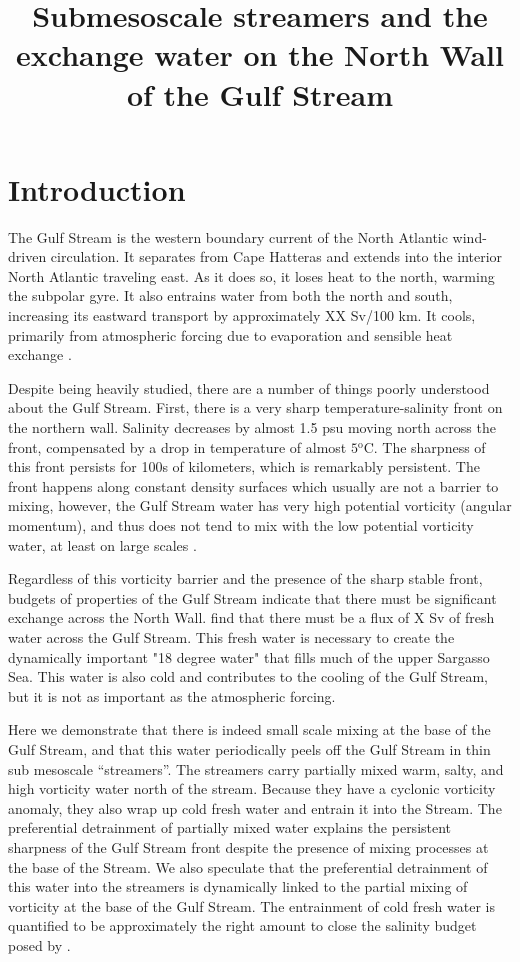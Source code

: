\documentclass{ametsoc}
\title{Submesoscale streamers and the exchange water on the North Wall of the Gulf Stream}
\affiliation{University of Victoria, Victoria, Canada}
\begin{document}
\maketitle


%
\section{Introduction}
The Gulf Stream is the western boundary current of the North Atlantic wind-driven circulation.  It separates from Cape Hatteras and extends into the interior North Atlantic traveling east.  As it does so, it loses heat to the north, warming the subpolar gyre.  It also entrains water from both the north and south, increasing its eastward transport by approximately XX Sv/100 km.  It cools, primarily from atmospheric forcing due to evaporation and sensible heat exchange \cite{joyceetal13}.  

Despite being heavily studied, there are a number of things poorly understood about the Gulf Stream.  First, there is a very sharp temperature-salinity front on the northern wall.  Salinity decreases by almost 1.5 psu moving north across the front, compensated by a drop in temperature of almost $5\mathrm{^oC}$.   The sharpness of this front persists for 100s of kilometers, which is remarkably persistent.  The front happens along constant density surfaces which usually are not a barrier to mixing, however, the Gulf Stream water has very high potential vorticity (angular momentum), and thus does not tend to mix with the low potential vorticity water, at least on large scales \citep{marshalletal06}.  

Regardless of this vorticity barrier and the presence of the sharp stable front, budgets of properties of the Gulf Stream indicate that there must be significant exchange across the North Wall. \citet{joyceetal13} find that there must be a flux of X Sv of fresh water across the Gulf Stream.  This fresh water is necessary to create the dynamically important "18 degree water" that fills much of the upper Sargasso Sea.  This water is also cold and contributes to the cooling of the Gulf Stream, but it is not as important as the atmospheric forcing.  

Here we demonstrate that there is indeed small scale mixing at the base of the Gulf Stream, and that this water periodically peels off the Gulf Stream in thin sub mesoscale ``streamers''.  The streamers carry partially mixed warm, salty, and high vorticity  water north of the stream.  Because they have a cyclonic vorticity anomaly, they also wrap up cold fresh water and entrain it into the Stream.  The preferential detrainment of partially mixed water explains the persistent sharpness of the Gulf Stream front despite the presence of mixing processes at the base of the Stream.  We also speculate that the preferential detrainment of this water into the streamers is dynamically linked to the partial mixing of vorticity at the base of the Gulf Stream. The entrainment of cold fresh water is quantified to be approximately the right amount to close the salinity budget posed by \citet{joyceetal13}.  
\end{document}
